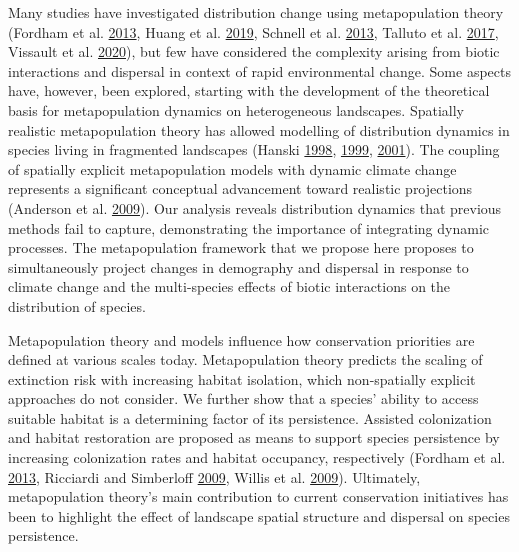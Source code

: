 \documentclass[12pt]{article}
\begin{document}
Many studies have investigated distribution change using metapopulation
theory (Fordham et al.
\protect\hyperlink{ref-fordham_adapted_2013}{2013}, Huang et al.
\protect\hyperlink{ref-huang_using_2019}{2019}, Schnell et al.
\protect\hyperlink{ref-schnell_estimating_2013}{2013}, Talluto et al.
\protect\hyperlink{ref-talluto_extinction_2017}{2017}, Vissault et al.
\protect\hyperlink{ref-vissault_slow_2020}{2020}), but few have
considered the complexity arising from biotic interactions and dispersal
in context of rapid environmental change. Some aspects have, however,
been explored, starting with the development of the theoretical basis
for metapopulation dynamics on heterogeneous landscapes. Spatially
realistic metapopulation theory has allowed modelling of distribution
dynamics in species living in fragmented landscapes (Hanski
\protect\hyperlink{ref-hanski_metapopulation_1998}{1998},
\protect\hyperlink{ref-hanski_habitat_1999}{1999},
\protect\hyperlink{ref-hanski_spatially_2001}{2001}). The coupling of
spatially explicit metapopulation models with dynamic climate change
represents a significant conceptual advancement toward realistic
projections (Anderson et al.
\protect\hyperlink{ref-anderson_dynamics_2009}{2009}). Our analysis
reveals distribution dynamics that previous methods fail to capture,
demonstrating the importance of integrating dynamic processes. The
metapopulation framework that we propose here proposes to simultaneously
project changes in demography and dispersal in response to climate
change and the multi-species effects of biotic interactions on the
distribution of species.

Metapopulation theory and models influence how conservation priorities
are defined at various scales today. Metapopulation theory predicts the
scaling of extinction risk with increasing habitat isolation, which
non-spatially explicit approaches do not consider. We further show that
a species' ability to access suitable habitat is a determining factor of
its persistence. Assisted colonization and habitat restoration are
proposed as means to support species persistence by increasing
colonization rates and habitat occupancy, respectively (Fordham et al.
\protect\hyperlink{ref-fordham_adapted_2013}{2013}, Ricciardi and
Simberloff \protect\hyperlink{ref-ricciardi_assisted_2009}{2009}, Willis
et al. \protect\hyperlink{ref-willis_assisted_2009}{2009}). Ultimately,
metapopulation theory's main contribution to current conservation
initiatives has been to highlight the effect of landscape spatial
structure and dispersal on species persistence.
\end{document}
